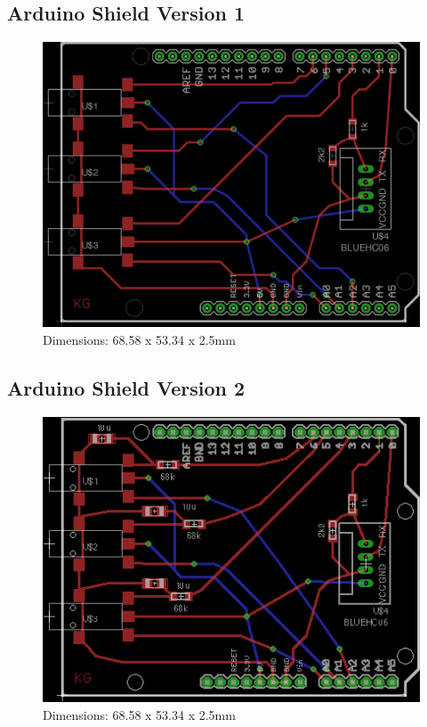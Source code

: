 \subsection{Arduino Shield Version 1}
\label{ardshieldpcb}
\begin{figure}[H]
\centering
\includegraphics[scale = 1.5]{Images/ard_pcb_01}
\\ Dimensions: 68.58 x 53.34 x 2.5mm
\end{figure}

\subsection{Arduino Shield Version 2}
\label{ardshieldpcb2}
\begin{figure}[H]
\centering
\includegraphics[scale = 1.5]{Images/ard_pcb_02}
\\ Dimensions: 68.58 x 53.34 x 2.5mm
\end{figure}







